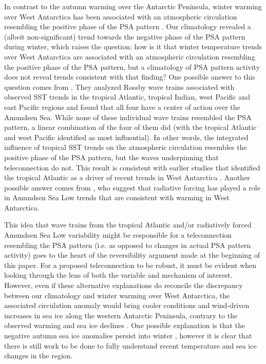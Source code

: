 In contrast to the autumn warming over the Antarctic Peninsula, winter warming over West Antarctica has been associated with an atmospheric circulation resembling the positive phase of the PSA pattern \citep{Ding2011}. Our climatology revealed a (albeit non-significant) trend towards the negative phase of the PSA pattern during winter, which raises the question: how is it that winter temperature trends over West Antarctica are associated with an atmospheric circulation resembling the positive phase of the PSA pattern, but a climatology of PSA pattern activity does not reveal trends consistent with that finding? One possible answer to this question comes from \citet{Li2015a}. They analyzed Rossby wave trains associated with observed SST trends in the tropical Atlantic, tropical Indian, west Pacific and east Pacific regions and found that all four have a center of action over the Amundsen Sea. While none of these individual wave trains resembled the PSA pattern, a linear combination of the four of them did (with the tropical Atlantic and west Pacific identified as most influential). In other words, the integrated influence of tropical SST trends on the atmospheric circulation resembles the positive phase of the PSA pattern, but the waves underpinning that teleconnection do not. This result is consistent with earlier studies that identified the tropical Atlantic as a driver of recent trends in West Antarctica \citep{Li2014,Simpkins2014}. Another possible answer comes from \citet{Fogt2015}, who suggest that radiative forcing has played a role in Amundsen Sea Low trends that are consistent with warming in West Antarctica. 

This idea that wave trains from the tropical Atlantic and/or radiatively forced Amundsen Sea Low variability might be responsible for a teleconnection resembling the PSA pattern (i.e. as opposed to changes in actual PSA pattern activity) goes to the heart of the reversibility argument made at the beginning of this paper. For a proposed teleconnection to be robust, it must be evident when looking through the lens of both the variable and mechanism of interest. However, even if these alternative explanations do reconcile the discrepancy between our climatology and winter warming over West Antarctica, the associated circulation anomaly would bring cooler conditions and wind-driven increases in sea ice along the western Antarctic Peninsula, contrary to the observed warming and sea ice declines \citep{Clem2015}. One possible explanation is that the negative autumn sea ice anomalies persist into winter \citep{Ding2013}, however it is clear that there is still work to be done to fully understand recent temperature and sea ice changes in the region.


